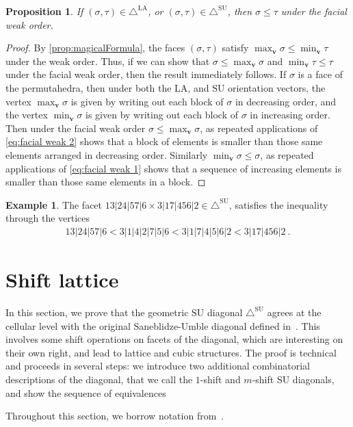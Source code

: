 \documentclass{amsart}
\newtheorem{proposition}[theorem]{Proposition}
\theoremstyle{definition}
\newtheorem{example}[theorem]{Example}
\newcommand{\SU}{\mathrm{SU}}
\newcommand{\LA}{\mathrm{LA}}
\newcommand{\SUD}{\triangle^{\mathrm{SU}}}
\newcommand{\LAD}{\triangle^{\mathrm{LA}}}
\begin{document}
\begin{proposition}
If $(\sigma,\tau)\in \LAD$, or $(\sigma,\tau)\in \SUD$, then $\sigma \leq \tau$ under the facial weak order.
\end{proposition}
\begin{proof}
By \cref{prop:magicalFormula}, the faces $(\sigma,\tau)$ satisfy $\max_{\mathbf{v}} \sigma \leq \min_{\mathbf{v}} \tau$ under the weak order.
Thus, if we can show that $\sigma\leq \max_{\mathbf{v}} \sigma$ and $\min_{\mathbf{v}} \tau \leq \tau$ under the facial weak order, then the result immediately follows.
If $\sigma$ is a face of the permutahedra, then under both the $\LA$, and $\SU$ orientation vectors, the vertex $\max_{\mathbf{v}} \sigma$ is given by writing out each block of $\sigma$ in decreasing order, and the vertex $\min_{\mathbf{v}} \sigma$ is given by writing out each  block of $\sigma$ in increasing order.
Then under the facial weak order
$\sigma \leq \max_{\mathbf{v}} \sigma$, as repeated applications of \cref{eq:facial weak 2} shows that a block of elements is smaller than those same elements arranged in decreasing order.
Similarly $\min_{\mathbf{v}} \sigma \leq \sigma$, as repeated applications of \cref{eq:facial weak 1} shows that a sequence of increasing elements is smaller than those same elements in a block. 
\end{proof}

\begin{example}
The facet $13|24|57|6 \times 3|17|456|2 \in \SUD$, satisfies the inequality through the vertices
\begin{align*}
    13|24|57|6 <  3|1|4|2|7|5|6 <  3|1|7|4|5|6|2 <  3|17|456|2 \ .
\end{align*}
\end{example}


\newpage
\section{Shift lattice}
\label{sec:shifts}

In this section, we prove that the geometric $\SU$ diagonal $\SUD$ agrees at the cellular level with the original Saneblidze-Umble diagonal defined in~\cite{SaneblidzeUmble}.
This involves some shift operations on facets of the diagonal, which are interesting on their own right, and lead to lattice and cubic structures.
The proof is technical and proceeds in several steps: we introduce two additional combinatorial descriptions of the diagonal, that we call the $1$-shift and $m$-shift $\SU$ diagonals, and show the sequence of equivalences
\begin{center}
\end{center}
Throughout this section, we borrow notation from~\cite{SaneblidzeUmble-comparingDiagonals}.
\end{document}
